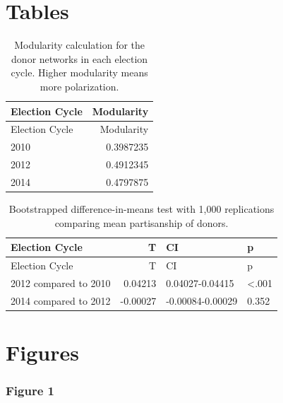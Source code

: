 \documentclass[12pt,]{article}
\begin{document}
\newpage

\hypertarget{tables}{%
\section{Tables}\label{tables}}

\begin{longtable}[]{@{}lr@{}}
\caption{Modularity calculation for the donor networks in each election
cycle. Higher modularity means more polarization.}\tabularnewline
\toprule
Election Cycle & Modularity\tabularnewline
\midrule
\endfirsthead
\toprule
Election Cycle & Modularity\tabularnewline
\midrule
\endhead
2010 & 0.3987235\tabularnewline
2012 & 0.4912345\tabularnewline
2014 & 0.4797875\tabularnewline
\bottomrule
\end{longtable}

\newpage

\begin{longtable}[]{@{}lrll@{}}
\caption{Bootstrapped difference-in-means test with 1,000 replications
comparing mean partisanship of donors.}\tabularnewline
\toprule
Election Cycle & T & CI & p\tabularnewline
\midrule
\endfirsthead
\toprule
Election Cycle & T & CI & p\tabularnewline
\midrule
\endhead
2012 compared to 2010 & 0.04213 & 0.04027-0.04415 &
\textless.001\tabularnewline
2014 compared to 2012 & -0.00027 & -0.00084-0.00029 &
0.352\tabularnewline
\bottomrule
\end{longtable}

\newpage

\hypertarget{figures}{%
\section{Figures}\label{figures}}

\hypertarget{figure-1}{%
\subsubsection{Figure 1}\label{figure-1}}
\end{document}
